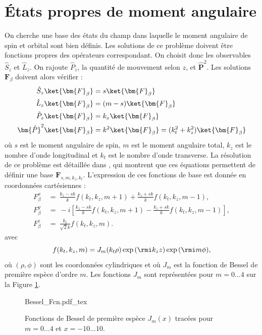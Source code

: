 \section{\'Etats propres de moment angulaire}
On cherche une base des états du champ dans laquelle le moment angulaire de spin et orbital sont bien définis. Les solutions de ce problème doivent être fonctions propres des opérateurs correspondant. On choisit donc les observables $\hat{S}_z$ et $\hat{L}_z$. On rajoute $\hat{P}_z$, la quantité de mouvement selon $z$, et $\bm{\hat{P}}^2$. Les solutions $\bm{F}_{\beta}$ doivent alors vérifier :
\begin{align*}
\hat{S}_z\ket{\bm{F}_{\beta}} &= s\ket{\bm{F}_{\beta}}\\
\hat{L}_z\ket{\bm{F}_{\beta}} &= (m-s)\ket{\bm{F}_{\beta}}\\
\hat{P}_z\ket{\bm{F}_{\beta}} &= k_z\ket{\bm{F}_{\beta}}\\
\bm{\hat{P}}^2\ket{\bm{F}_{\beta}} &= k^2\ket{\bm{F}_{\beta}} = (k_t^2+k_z^2)\ket{\bm{F}_{\beta}}
\end{align*}
où $s$ est le moment angulaire de spin, $m$ est le moment angulaire total, $k_z$ est le nombre d'onde longitudinal et $k_t$ est le nombre d'onde transverse. La résolution de ce problème est détaillée dans , qui montrent que ces équations permettent de définir une base $\bm{F}_{s,m,k_z,k_t}$. L'expression de ces fonctions de base est donnée en coordonnées cartésiennes :
\begin{equation}
\begin{aligned}
F_{\beta}^x ~&= ~\frac{k_z - sk}{k}f(k_t,k_z,m+1)+\frac{k_z + sk}{k}f(k_t,k_z,m-1),\\
F_{\beta}^y ~&= ~-i\left[\frac{k_z - sk}{k}f(k_t,k_z,m+1)-\frac{k_z + sk}{k}f(k_t,k_z,m-1)\right],\\
F_{\beta}^z ~&= ~\frac{k_t}{\sqrt{2}k}f(k_t,k_z,m).
\end{aligned}
\label{eqAMModes}
\end{equation}
avec
\begin{equation}
f(k_t,k_z,m) = J_m(k_t\rho)\exp{(\rmi k_zz)}\exp{(\rmi m\phi)},
\label{eqModeFcn}
\end{equation}
où $(\rho,\phi)$ sont les coordonnées cylindriques et où $J_m$ est la fonction de Bessel de première espèce d'ordre $m$. Les fonctions $J_m$ sont représentées pour $m=0\ldots4$ sur la Figure \ref{Fig:BesselFcn}. 

\begin{figure}[!ht]
\centering
\def\svgwidth{0.8\columnwidth}
{Bessel_Fcn.pdf_tex}
\caption{Fonctions de Bessel de première espèce $J_m(x)$ tracées pour $m=0\ldots4$ et $x=-10\ldots10$.}
\label{Fig:BesselFcn}
\end{figure}

